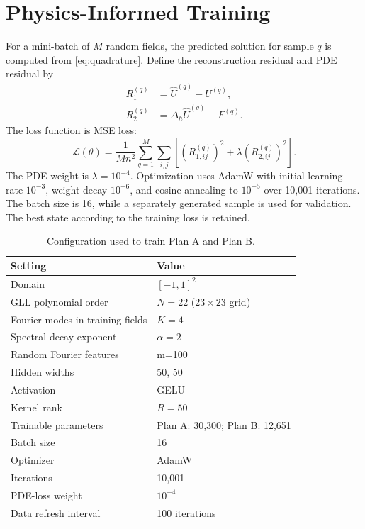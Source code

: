 \documentclass[11pt,a4paper]{article}
\begin{document}
\section{Physics-Informed Training}

For a mini-batch of $M$ random fields, the predicted solution for sample $q$ is computed from \cref{eq:quadrature}. Define the reconstruction residual and PDE residual by
\begin{align}
  R_{1}^{(q)} &= \widehat{U}^{(q)}-U^{(q)},\\
  R_{2}^{(q)} &= \Delta_h\widehat{U}^{(q)}-F^{(q)}.
\end{align}
The loss function is MSE loss:
\begin{equation}
  \mathcal{L}(\theta)=\frac{1}{Mn^2}
  \sum_{q=1}^{M}\sum_{i,j}
  \left[
  \left(R_{1,ij}^{(q)}\right)^2
  +\lambda\left(R_{2,ij}^{(q)}\right)^2
  \right].
  \label{eq:loss}
\end{equation}
The PDE weight is $\lambda=10^{-4}$. Optimization uses AdamW with initial learning rate $10^{-3}$, weight decay $10^{-6}$, and cosine annealing to $10^{-5}$ over 10,001 iterations. The batch size is 16, while a separately generated sample is used for validation. The best state according to the training loss is retained.

\begin{table}[H]
  \centering
  \caption{Configuration used to train Plan A and Plan B.}
  \label{tab:settings}
  \begin{tabular}{@{}ll@{}}
    \toprule
    Setting & Value \\
    \midrule
    Domain & $[-1,1]^2$ \\
    GLL polynomial order & $N=22$ ($23\times23$ grid) \\
    Fourier modes in training fields & $K=4$ \\
    Spectral decay exponent & $\alpha=2$ \\
    Random Fourier features & m=100 \\
    Hidden widths & 50, 50 \\
    Activation & GELU \\
    Kernel rank & $R=50$ \\
    Trainable parameters & Plan A: 30,300; Plan B: 12,651 \\
    Batch size & 16 \\
    Optimizer & AdamW \\
    Iterations & 10,001 \\
    PDE-loss weight & $10^{-4}$ \\
    Data refresh interval & 100 iterations \\
    \bottomrule
  \end{tabular}
\end{table}
\end{document}
